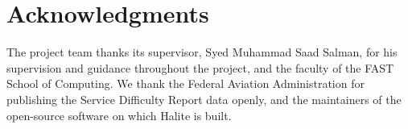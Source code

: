 \chapter*{Acknowledgments}
The project team thanks its supervisor, Syed Muhammad Saad Salman, for his supervision and guidance throughout the project, and the faculty of the FAST School of Computing. We thank the Federal Aviation Administration for publishing the Service Difficulty Report data openly, and the maintainers of the open-source software on which Halite is built.
